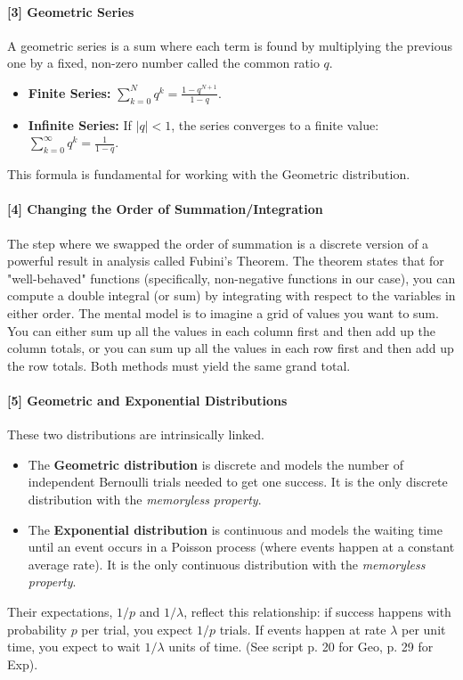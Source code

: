 \documentclass[11pt,a4paper]{article}
\begin{document}
\hypertarget{note_geo_series}{}
\paragraph{[3] Geometric Series}
A geometric series is a sum where each term is found by multiplying the previous one by a fixed, non-zero number called the common ratio $q$.
\begin{itemize}
    \item \textbf{Finite Series:} $\sum_{k=0}^{N} q^k = \frac{1 - q^{N+1}}{1-q}$.
    \item \textbf{Infinite Series:} If $|q|<1$, the series converges to a finite value: $\sum_{k=0}^{\infty} q^k = \frac{1}{1-q}$.
\end{itemize}
This formula is fundamental for working with the Geometric distribution.

\hypertarget{note_fubini}{}
\paragraph{[4] Changing the Order of Summation/Integration}
The step where we swapped the order of summation is a discrete version of a powerful result in analysis called Fubini's Theorem. The theorem states that for "well-behaved" functions (specifically, non-negative functions in our case), you can compute a double integral (or sum) by integrating with respect to the variables in either order. The mental model is to imagine a grid of values you want to sum. You can either sum up all the values in each column first and then add up the column totals, or you can sum up all the values in each row first and then add up the row totals. Both methods must yield the same grand total.

\hypertarget{note_geo_exp}{}
\paragraph{[5] Geometric and Exponential Distributions}
These two distributions are intrinsically linked.
\begin{itemize}
    \item The \textbf{Geometric distribution} is discrete and models the number of independent Bernoulli trials needed to get one success. It is the only discrete distribution with the \textit{memoryless property}.
    \item The \textbf{Exponential distribution} is continuous and models the waiting time until an event occurs in a Poisson process (where events happen at a constant average rate). It is the only continuous distribution with the \textit{memoryless property}.
\end{itemize}
Their expectations, $1/p$ and $1/\lambda$, reflect this relationship: if success happens with probability $p$ per trial, you expect $1/p$ trials. If events happen at rate $\lambda$ per unit time, you expect to wait $1/\lambda$ units of time. (See script p. 20 for Geo, p. 29 for Exp).
\end{document}
